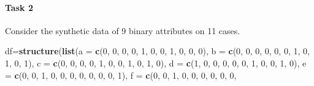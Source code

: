 \documentclass[
]{book}
\newenvironment{Shaded}{\begin{snugshade}}{\end{snugshade}}
\newcommand{\AttributeTok}[1]{\textcolor[rgb]{0.13,0.29,0.53}{#1}}
\newcommand{\DecValTok}[1]{\textcolor[rgb]{0.00,0.00,0.81}{#1}}
\newcommand{\FunctionTok}[1]{\textcolor[rgb]{0.13,0.29,0.53}{\textbf{#1}}}
\newcommand{\NormalTok}[1]{#1}
\newcommand{\OtherTok}[1]{\textcolor[rgb]{0.56,0.35,0.01}{#1}}
\theoremstyle{definition}
\theoremstyle{definition}
\theoremstyle{definition}
\theoremstyle{definition}
\theoremstyle{remark}
\begin{document}
\paragraph*{Task 2}\label{task-2-1}

Consider the synthetic data of 9 binary attributes on 11 cases.

\begin{Shaded}
\begin{Highlighting}[]
\NormalTok{df}\OtherTok{=}\FunctionTok{structure}\NormalTok{(}\FunctionTok{list}\NormalTok{(}\AttributeTok{a =} \FunctionTok{c}\NormalTok{(}\DecValTok{0}\NormalTok{, }\DecValTok{0}\NormalTok{, }\DecValTok{0}\NormalTok{, }\DecValTok{0}\NormalTok{, }\DecValTok{1}\NormalTok{, }\DecValTok{0}\NormalTok{, }\DecValTok{0}\NormalTok{, }\DecValTok{1}\NormalTok{, }\DecValTok{0}\NormalTok{, }\DecValTok{0}\NormalTok{, }\DecValTok{0}\NormalTok{), }\AttributeTok{b =} \FunctionTok{c}\NormalTok{(}\DecValTok{0}\NormalTok{, }
\DecValTok{0}\NormalTok{, }\DecValTok{0}\NormalTok{, }\DecValTok{0}\NormalTok{, }\DecValTok{0}\NormalTok{, }\DecValTok{0}\NormalTok{, }\DecValTok{1}\NormalTok{, }\DecValTok{0}\NormalTok{, }\DecValTok{1}\NormalTok{, }\DecValTok{0}\NormalTok{, }\DecValTok{1}\NormalTok{), }\AttributeTok{c =} \FunctionTok{c}\NormalTok{(}\DecValTok{0}\NormalTok{, }\DecValTok{0}\NormalTok{, }\DecValTok{0}\NormalTok{, }\DecValTok{0}\NormalTok{, }\DecValTok{1}\NormalTok{, }\DecValTok{0}\NormalTok{, }\DecValTok{0}\NormalTok{, }\DecValTok{1}\NormalTok{, }
\DecValTok{0}\NormalTok{, }\DecValTok{1}\NormalTok{, }\DecValTok{0}\NormalTok{), }\AttributeTok{d =} \FunctionTok{c}\NormalTok{(}\DecValTok{1}\NormalTok{, }\DecValTok{0}\NormalTok{, }\DecValTok{0}\NormalTok{, }\DecValTok{0}\NormalTok{, }\DecValTok{0}\NormalTok{, }\DecValTok{0}\NormalTok{, }\DecValTok{1}\NormalTok{, }\DecValTok{0}\NormalTok{, }\DecValTok{0}\NormalTok{, }\DecValTok{1}\NormalTok{, }\DecValTok{0}\NormalTok{), }\AttributeTok{e =} \FunctionTok{c}\NormalTok{(}\DecValTok{0}\NormalTok{, }\DecValTok{0}\NormalTok{, }
\DecValTok{1}\NormalTok{, }\DecValTok{0}\NormalTok{, }\DecValTok{0}\NormalTok{, }\DecValTok{0}\NormalTok{, }\DecValTok{0}\NormalTok{, }\DecValTok{0}\NormalTok{, }\DecValTok{0}\NormalTok{, }\DecValTok{0}\NormalTok{, }\DecValTok{1}\NormalTok{), }\AttributeTok{f =} \FunctionTok{c}\NormalTok{(}\DecValTok{0}\NormalTok{, }\DecValTok{0}\NormalTok{, }\DecValTok{1}\NormalTok{, }\DecValTok{0}\NormalTok{, }\DecValTok{0}\NormalTok{, }\DecValTok{0}\NormalTok{, }\DecValTok{0}\NormalTok{, }\DecValTok{0}\NormalTok{, }\DecValTok{0}\NormalTok{, }

\end{Highlighting}
\end{Shaded}
\end{document}

